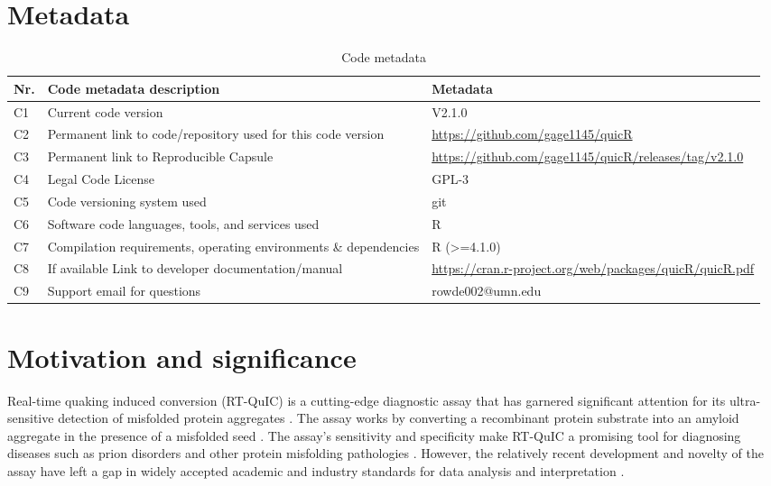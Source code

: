 \documentclass[preprint,12pt, a4paper]{elsarticle}
\begin{document}

\section*{Metadata}

\begin{table}[ht]
    \fontsize{9}{9}\selectfont
    \begin{tabular}{|l|p{6.5cm}|p{6.5cm}|}
        \hline
        \textbf{Nr.} & \textbf{Code metadata description} & \textbf{Metadata} \\
        \hline
        C1 & Current code version & V2.1.0 \\
        \hline
        C2 & Permanent link to code/repository used for this code version & \url{https://github.com/gage1145/quicR} \\
        \hline
        C3  & Permanent link to Reproducible Capsule & \url{https://github.com/gage1145/quicR/releases/tag/v2.1.0}\\
        \hline
        C4 & Legal Code License & GPL-3 \\
        \hline
        C5 & Code versioning system used & git \\
        \hline
        C6 & Software code languages, tools, and services used & R \\
        \hline
        C7 & Compilation requirements, operating environments \& dependencies & R (>=4.1.0) \\
        \hline
        C8 & If available Link to developer documentation/manual & \url{https://cran.r-project.org/web/packages/quicR/quicR.pdf} \\
        \hline
        C9 & Support email for questions & rowde002@umn.edu\\
        \hline
    \end{tabular}
\caption{Code metadata}
\label{codeMetadata} 
\end{table}


\section{Motivation and significance}
    Real-time quaking induced conversion (RT-QuIC) is a cutting-edge diagnostic assay that has garnered significant attention for its ultra-sensitive detection of misfolded protein aggregates \cite{Wilham2010, Atarashi2011}. The assay works by converting a recombinant protein substrate into an amyloid aggregate in the presence of a misfolded seed \cite{Wilham2010, Orru2012, Orru2017, Orru2015, Bongianni2019, Dassanayake2016, Hwang2018, Groveman2018, Metrick2020}. The assay's sensitivity and specificity make RT-QuIC a promising tool for diagnosing diseases such as prion disorders and other protein misfolding pathologies \cite{Fiorini2020, Franceschini2017, Picasso-Risso2022, Holz2021}. However, the relatively recent development and novelty of the assay have left a gap in widely accepted academic and industry standards for data analysis and interpretation \cite{Rowden2023}.
\end{document}
